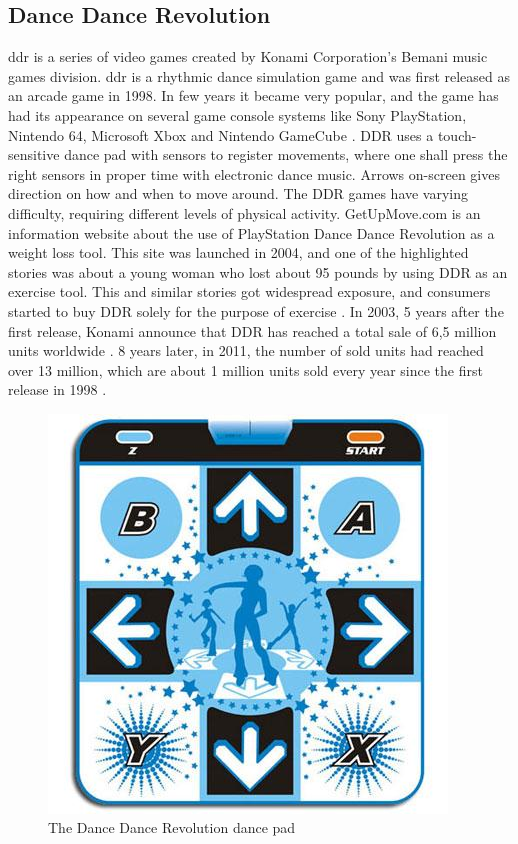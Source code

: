 \subsection{Dance Dance Revolution}
\ac{ddr} is a series of video games created by Konami Corporation’s Bemani music games division. \ac{ddr} is a rhythmic dance simulation game and was first released as an arcade game in 1998. In few years it became very popular, and the game has had its appearance on several game console systems like Sony PlayStation, Nintendo 64, Microsoft Xbox and Nintendo GameCube \cite{bogost2005rhetoric}. DDR uses a touch-sensitive dance pad with sensors to register movements, where one shall press the right sensors in proper time with electronic dance music. Arrows on-screen gives direction on how and when to move around. The DDR games have varying difficulty, requiring different levels of physical activity. GetUpMove.com is an information website about the use of PlayStation Dance Dance Revolution as a weight loss tool. This site was launched in 2004, and one of the highlighted stories was about a young woman who lost about 95 pounds by using DDR as an exercise tool. This and similar stories got widespread exposure, and consumers started to buy DDR solely for the purpose of exercise \cite{bogost2005rhetoric}. In 2003, 5 years after the first release, Konami announce that DDR has reached a total sale of 6,5 million units worldwide \cite{gamespot}. 8 years later, in 2011, the number of sold units had reached over 13 million, which are about 1 million units sold every year since the first release in 1998 \cite{gaygamer}. 
\begin{figure}[h!]
\begin{center}
\includegraphics[scale=0.5]{ddrpad}
\caption[Dance Dance Revolution]{The Dance Dance Revolution dance pad}
\label{fig:DDRPad}
\end{center}
\end{figure}

